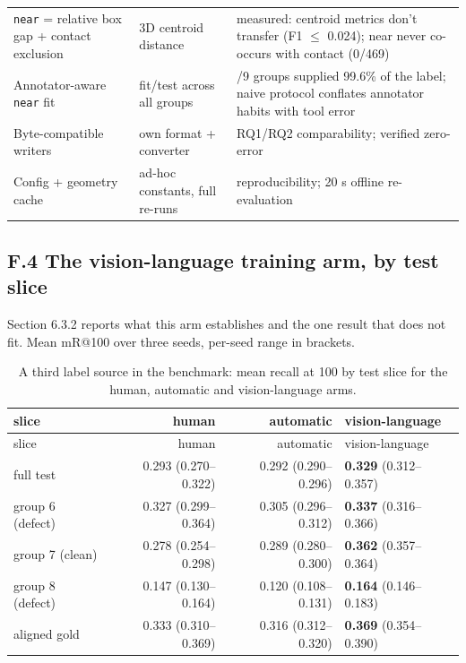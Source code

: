 \begin{center}
\begin{longtable}{>{\raggedright\arraybackslash}p{}>{\raggedright\arraybackslash}p{}>{\raggedright\arraybackslash}p{}}
\texttt{near} = relative box gap + contact exclusion & 3D centroid distance & measured: centroid metrics don't transfer (F1 $\leq$ 0.024); near never co-occurs with contact (0/469) \\
Annotator-aware \texttt{near} fit & fit/test across all groups & 3/9 groups supplied 99.6\% of the label; naive protocol conflates annotator habits with tool error \\
Byte-compatible writers & own format + converter & RQ1/RQ2 comparability; verified zero-error \\
Config + geometry cache & ad-hoc constants, full re-runs & reproducibility; 20 s offline re-evaluation \\
\hline
\end{longtable}
\end{center}

\subsection{F.4 The vision-language training arm, by test slice}

Section 6.3.2 reports what this arm establishes and the one result that does not fit. Mean mR@100 over three seeds, per-seed range in brackets.

\begin{center}
\setlength{\tabcolsep}{6pt}
\small
\begin{longtable}{lrrl}
\caption[A third label source in the benchmark]{A third label source in the benchmark: mean recall at 100 by test slice for the human, automatic and vision-language arms.}\\
\hline
slice & human & automatic & vision-language \\
\hline
\endfirsthead
\hline
slice & human & automatic & vision-language \\
\hline
\endhead
full test & 0.293 (0.270--0.322) & 0.292 (0.290--0.296) & \textbf{0.329} (0.312--0.357) \\
group 6 (defect) & 0.327 (0.299--0.364) & 0.305 (0.296--0.312) & \textbf{0.337} (0.316--0.366) \\
group 7 (clean) & 0.278 (0.254--0.298) & 0.289 (0.280--0.300) & \textbf{0.362} (0.357--0.364) \\
group 8 (defect) & 0.147 (0.130--0.164) & 0.120 (0.108--0.131) & \textbf{0.164} (0.146--0.183) \\
aligned gold & 0.333 (0.310--0.369) & 0.316 (0.312--0.320) & \textbf{0.369} (0.354--0.390) \\
\hline
\end{longtable}
\end{center}

